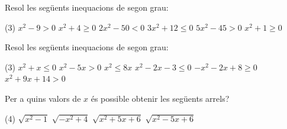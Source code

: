  \begin{mylist}
 		 
 	 
\exer  Resol les següents inequacions de segon grau:
  \begin{tasks}(3)
 \task $x^2-9>0$ 
 \task ${x}^{2} + 4 \ge 0$
\task $2{x}^{2} - 50 < 0$  
\task $3{x}^{2} +12 \le  0$    
\task $5{x}^{2} - 45 > 0$  
\task ${x}^{2 }+ 1 \ge  0$
 \end{tasks}

\end{mylist}



\begin{mylist}

 
\exer  Resol les següents inequacions de segon grau:
  \begin{tasks}(3)
\task $x^{2} + {x} \le 0  $ 
\task $x^{2} - 5{x} > 0 $  
\task $x^{2 } \le  8{x}$
	\task $x^{2} - 2{x} - 3 \le  0$
    \task ${-x}^{2}-2{x} + 8 \ge  0$
     \task $x^{2 }+ 9{x} + 14 > 0$
 \end{tasks}

 
  \exer Per a quins valors de $x$ és possible obtenir les següents arrels?
 \begin{tasks}(4)
 	\task $\sqrt{x^{2} -1} $   \task $\sqrt{-x^{2} +4} $   \task $\sqrt{x^{2} +5x+6} $  \task $\sqrt{x^{2} -5x+6} $
 \end{tasks}
\answers[cols=1]{[$[-1,3]$, $[-4,2]$, $(-\infty,-7)\cup (-2,+\infty)$, $x=3$, $\Re$, $\Re$]}



\end{mylist}

